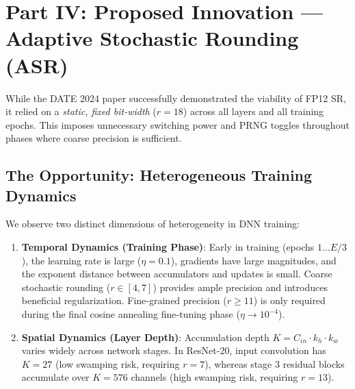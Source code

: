 \documentclass[11pt,a4paper]{article}
\begin{document}
\section{Part IV: Proposed Innovation — Adaptive Stochastic Rounding (ASR)}
While the DATE 2024 paper successfully demonstrated the viability of FP12 SR, it relied on a \textit{static, fixed bit-width} ($r=18$) across all layers and all training epochs. This imposes unnecessary switching power and PRNG toggles throughout phases where coarse precision is sufficient.

\subsection{The Opportunity: Heterogeneous Training Dynamics}
We observe two distinct dimensions of heterogeneity in DNN training:
\begin{enumerate}
    \item \textbf{Temporal Dynamics (Training Phase)}: Early in training (epochs $1 \dots E/3$), the learning rate is large ($\eta = 0.1$), gradients have large magnitudes, and the exponent distance between accumulators and updates is small. Coarse stochastic rounding ($r \in [4, 7]$) provides ample precision and introduces beneficial regularization. Fine-grained precision ($r \ge 11$) is only required during the final cosine annealing fine-tuning phase ($\eta \to 10^{-4}$).
    \item \textbf{Spatial Dynamics (Layer Depth)}: Accumulation depth $K = C_{in} \cdot k_h \cdot k_w$ varies widely across network stages. In ResNet-20, input convolution has $K = 27$ (low swamping risk, requiring $r=7$), whereas stage 3 residual blocks accumulate over $K = 576$ channels (high swamping risk, requiring $r=13$).
\end{enumerate}
\end{document}
